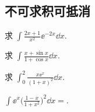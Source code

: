 \subsection{不可求积可抵消}

	\begin{ti}
		求 $\int \frac{2x + 1}{x^{2}} \ee^{-2x} \dd{x}$.
	\end{ti}

	\begin{ti}
		求 $\int \frac{x + \sin x}{1 + \cos x} \dd{x}$.
	\end{ti}

	\begin{ti}
		求 $\int_{0}^{2} \frac{x \ee^{x}}{(1 + x)^{2}} \dd{x}$.
	\end{ti}

	\begin{ti}
		$\int \ee^{x} \bigl( \frac{1 - x}{1 + x^{2}} \bigr)^{2} \dd{x} = $\htwo.
	\end{ti}